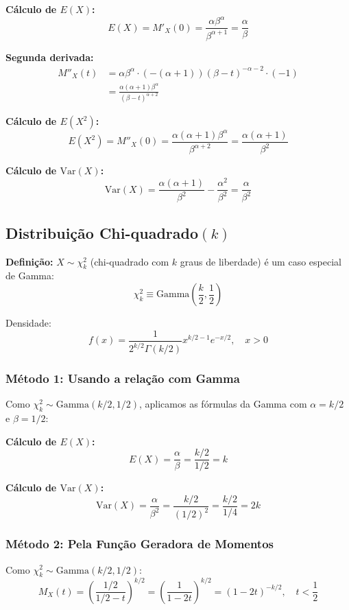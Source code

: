 \documentclass[12pt,a4paper]{article}
\theoremstyle{plain}
\theoremstyle{definition}
\theoremstyle{remark}
\begin{document}
\textbf{Cálculo de \(E(X)\):}
\[
E(X) = M'_X(0) = \frac{\alpha \beta^\alpha}{\beta^{\alpha+1}} = \frac{\alpha}{\beta}
\]

\textbf{Segunda derivada:}
\begin{align}
M''_X(t) &= \alpha \beta^\alpha \cdot (-(\alpha+1))(\beta-t)^{-\alpha-2} \cdot (-1) \\
&= \frac{\alpha(\alpha+1) \beta^\alpha}{(\beta-t)^{\alpha+2}}
\end{align}

\textbf{Cálculo de \(E(X^2)\):}
\[
E(X^2) = M''_X(0) = \frac{\alpha(\alpha+1) \beta^\alpha}{\beta^{\alpha+2}} = \frac{\alpha(\alpha+1)}{\beta^2}
\]

\textbf{Cálculo de \(\text{Var}(X)\):}
\[
\text{Var}(X) = \frac{\alpha(\alpha+1)}{\beta^2} - \frac{\alpha^2}{\beta^2} = \frac{\alpha}{\beta^2}
\]

\subsection{Distribuição Chi-quadrado\((k)\)}

\textbf{Definição:} \(X \sim \chi^2_k\) (chi-quadrado com \(k\) graus de liberdade) é um caso especial de Gamma:
\[
\chi^2_k \equiv \text{Gamma}\left(\frac{k}{2}, \frac{1}{2}\right)
\]

Densidade:
\[
f(x) = \frac{1}{2^{k/2} \Gamma(k/2)} x^{k/2-1} e^{-x/2}, \quad x > 0
\]

\subsubsection{Método 1: Usando a relação com Gamma}

Como \(\chi^2_k \sim \text{Gamma}(k/2, 1/2)\), aplicamos as fórmulas da Gamma com \(\alpha = k/2\) e \(\beta = 1/2\):

\textbf{Cálculo de \(E(X)\):}
\[
E(X) = \frac{\alpha}{\beta} = \frac{k/2}{1/2} = k
\]

\textbf{Cálculo de \(\text{Var}(X)\):}
\[
\text{Var}(X) = \frac{\alpha}{\beta^2} = \frac{k/2}{(1/2)^2} = \frac{k/2}{1/4} = 2k
\]

\subsubsection{Método 2: Pela Função Geradora de Momentos}

Como \(\chi^2_k \sim \text{Gamma}(k/2, 1/2)\):
\[
M_X(t) = \left(\frac{1/2}{1/2-t}\right)^{k/2} = \left(\frac{1}{1-2t}\right)^{k/2} = (1-2t)^{-k/2}, \quad t < \frac{1}{2}
\]
\end{document}
